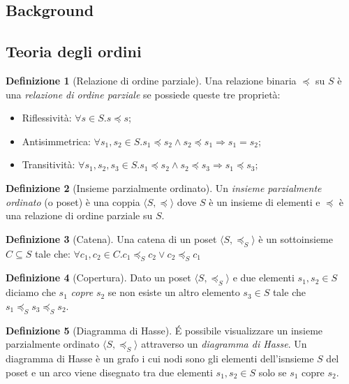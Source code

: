 \documentclass{article}
\theoremstyle{definition}
\newtheorem{definition}{Definizione}[section]
\theoremstyle{definition}
\newcommand{\simplePoset}[1]{\langle #1, \preceq_{#1}\rangle}
\begin{document}
\begin{center}
\section*{Background}
\end{center}

\subsection{Teoria degli ordini}
\begin{definition}[Relazione di ordine parziale]
Una relazione binaria \(\preceq\) su \(S\) è una \textit{relazione di ordine parziale} se possiede queste tre proprietà:
\begin{itemize}
\item Riflessività: \(\forall s\in S. s\preceq s\);
\item Antisimmetrica: \(\forall s_1, s_2\in S. s_1\preceq s_2 \wedge s_2\preceq s_1 \Rightarrow s_1=s_2\);
\item Transitività: \(\forall s_1, s_2, s_3 \in S. s_1\preceq s_2 \wedge s_2\preceq s_3 \Rightarrow s_1\preceq s_3\);
\end{itemize}
\end{definition}

\begin{definition}[Insieme parzialmente ordinato]
Un \textit{insieme parzialmente ordinato} (o poset) è una coppia \(\langle S, \preceq\rangle\) dove \(S\) è un insieme di elementi e \(\preceq\) è una relazione di ordine parziale su \(S\).
\end{definition}

\begin{definition}[Catena]
Una catena di un poset \(\simplePoset{S}\) è un sottoinsieme \(C\subseteq S\) tale che: \(\forall c_1, c_2 \in C. c_1\preceq_{S} c_2 \vee c_2\preceq_{S} c_1\)
\end{definition}

\begin{definition}[Copertura]
Dato un poset \(\simplePoset{S}\) e due elementi \(s_1, s_2 \in S\) diciamo che \(s_1\) \textit{copre} \(s_2\) se non esiste un altro elemento \(s_3\in S\) tale che \(s_1 \preceq_{S} s_3 \preceq_{S} s_2\).
\end{definition}

\begin{definition}[Diagramma di Hasse]
\'E possibile visualizzare un insieme parzialmente ordinato \(\simplePoset{S}\) attraverso un \textit{diagramma di Hasse}. Un diagramma di Hasse è un grafo i cui nodi sono gli elementi dell'isnsieme \(S\) del poset e un arco viene disegnato tra due elementi \(s_1, s_2 \in S\) solo se \(s_1\) copre \(s_2\).
\end{definition}
\end{document}
